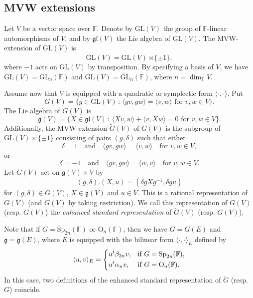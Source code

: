 \documentclass[12pt]{amsart}
\theoremstyle{definition}
\theoremstyle{remark}\newtheorem{rmk}[lm]{Remark}
\newcommand{\RO}{{\mathrm {O}}}
\newcommand{\GL}{{\mathrm{GL}}}
\newcommand{\Sp}{{\mathrm{Sp}}}
\newcommand{\g}{\mathfrak g}
\newcommand{\gl}{\mathfrak g \mathfrak l}
\newcommand{\C}{\mathbb{F}}
\renewcommand{\mid}{\,:\,}
\begin{document}
	\subsection{MVW extensions}
	Let $V$ be a vector space over $\C$. Denote by $\GL(V)$ the group of $\C$-linear automorphisms of $V$, and by $\gl(V)$ the Lie algebra of $\GL(V)$. The MVW-extension of $\GL(V)$ is
	\begin{equation*}
		\breve{\GL}(V)=\GL(V)\rtimes\{\pm 1\},
	\end{equation*}
	where $-1$ acts on $\GL(V)$ by transposition. 
      By specifying a basis of $V$, we have $\GL(V)=\GL_n(\C)$ and $\breve{\GL}(V)=\breve{\GL}_n(\C)$, where $n=\dim_{\C}V$.
	
	Assume now that $V$ is equipped with a quadratic or symplectic form $\langle\cdot,\cdot\rangle$. Put
	\begin{equation*}
		G(V)=\{g\in\GL(V)\mid\langle gv,gw\rangle=\langle v,w\rangle\text{ for }v,w\in V\}.
	\end{equation*}
	The Lie algebra of $G(V)$ is
	\begin{equation*}
		\g(V)=\{X\in\gl(V)\mid\langle Xv,w\rangle+\langle v,Xw\rangle=0\text{ for }v,w\in V\}.
	\end{equation*}
	Additionally, the MVW-extension $\breve{G}(V)$ of $G(V)$ is the subgroup of $\GL(V)\times\{\pm 1\}$ consisting of pairs $(g,\delta)$ such that either
	\begin{equation*}
		\delta=1\quad\text{and}\quad\langle gv,gw\rangle=\langle v,w\rangle\quad\text{for }v,w\in V,
	\end{equation*}
	or
	\begin{equation*}
		\delta=-1\quad\text{and}\quad\langle gv,gw\rangle=\langle w,v\rangle\quad\text{for }v,w\in V.
	\end{equation*}
    Let $\breve{G}(V)$ act on $\g(V)\times V$ by
    \begin{equation*}
        (g,\delta).(X,u)=(\delta gXg^{-1},\delta gu)
    \end{equation*}
    for $(g,\delta)\in\breve{G}(V)$, $X\in\g(V)$ and $u\in V$. This is a rational representation of $\breve{G}(V)$ (and $G(V)$ by taking restriction). We call this representation of $\breve{G}(V)$ (resp. $G(V)$) the \emph{enhanced standard representation} of $\breve{G}(V)$ (resp. $G(V)$).
    
   Note that if $G=\Sp_{2n}(\C)$ or $\RO_n(\C)$, then we have $G=G(E)$ and $\g=\g(E)$, where $E$ is equipped with the bilinear form $\langle\cdot,\cdot\rangle_E$ defined by
    \begin{equation*}
        \langle u,v\rangle_E=\begin{cases*}
            u^t\beta_{2n}v,&if $G=\Sp_{2n}(\C)$,\\
            u^t\alpha_nv,&if $G=\RO_n(\C)$.
        \end{cases*}
    \end{equation*}
    In this case, two definitions of the enhanced standard representation of $\breve{G}$ (resp. $G$) coincide.
\end{document}
